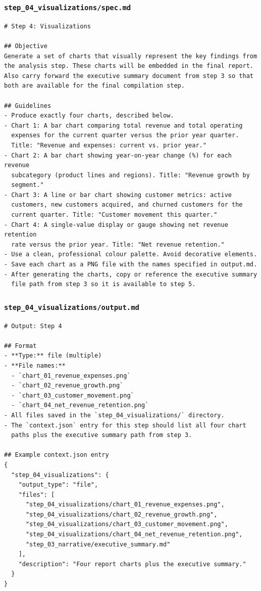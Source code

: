 \documentclass[12pt, a4paper]{article}
\begin{document}
\subsubsection{\texttt{step\_04\_visualizations/spec.md}}

\begin{lstlisting}[language={}]
# Step 4: Visualizations

## Objective
Generate a set of charts that visually represent the key findings from
the analysis step. These charts will be embedded in the final report.
Also carry forward the executive summary document from step 3 so that
both are available for the final compilation step.

## Guidelines
- Produce exactly four charts, described below.
- Chart 1: A bar chart comparing total revenue and total operating
  expenses for the current quarter versus the prior year quarter.
  Title: "Revenue and expenses: current vs. prior year."
- Chart 2: A bar chart showing year-on-year change (%) for each revenue
  subcategory (product lines and regions). Title: "Revenue growth by
  segment."
- Chart 3: A line or bar chart showing customer metrics: active
  customers, new customers acquired, and churned customers for the
  current quarter. Title: "Customer movement this quarter."
- Chart 4: A single-value display or gauge showing net revenue retention
  rate versus the prior year. Title: "Net revenue retention."
- Use a clean, professional colour palette. Avoid decorative elements.
- Save each chart as a PNG file with the names specified in output.md.
- After generating the charts, copy or reference the executive summary
  file path from step 3 so it is available to step 5.
\end{lstlisting}

\subsubsection{\texttt{step\_04\_visualizations/output.md}}

\begin{lstlisting}[language={}]
# Output: Step 4

## Format
- **Type:** file (multiple)
- **File names:**
  - `chart_01_revenue_expenses.png`
  - `chart_02_revenue_growth.png`
  - `chart_03_customer_movement.png`
  - `chart_04_net_revenue_retention.png`
- All files saved in the `step_04_visualizations/` directory.
- The `context.json` entry for this step should list all four chart
  paths plus the executive summary path from step 3.

## Example context.json entry
{
  "step_04_visualizations": {
    "output_type": "file",
    "files": [
      "step_04_visualizations/chart_01_revenue_expenses.png",
      "step_04_visualizations/chart_02_revenue_growth.png",
      "step_04_visualizations/chart_03_customer_movement.png",
      "step_04_visualizations/chart_04_net_revenue_retention.png",
      "step_03_narrative/executive_summary.md"
    ],
    "description": "Four report charts plus the executive summary."
  }
}
\end{lstlisting}
\end{document}
